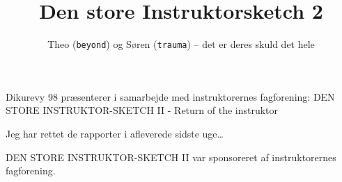 \documentclass[danish]{article}
\title{Den store Instruktorsketch 2}
\author{Theo (\texttt{beyond}) og Søren (\texttt{trauma}) -- det er deres skuld det hele}
\begin{document}
\maketitle

\begin{sketch}

\begin{roles}
\end{roles}

 Dikurevy 98 præsenterer i samarbejde med instruktorernes
fagforening: DEN STORE INSTRUKTOR-SKETCH II - Return of the instruktor


 Jeg har rettet de rapporter i afleverede sidste uge\ldots



 DEN STORE INSTRUKTOR-SKETCH II var sponsoreret af instruktorernes
fagforening.

\end{sketch}
\end{document}
